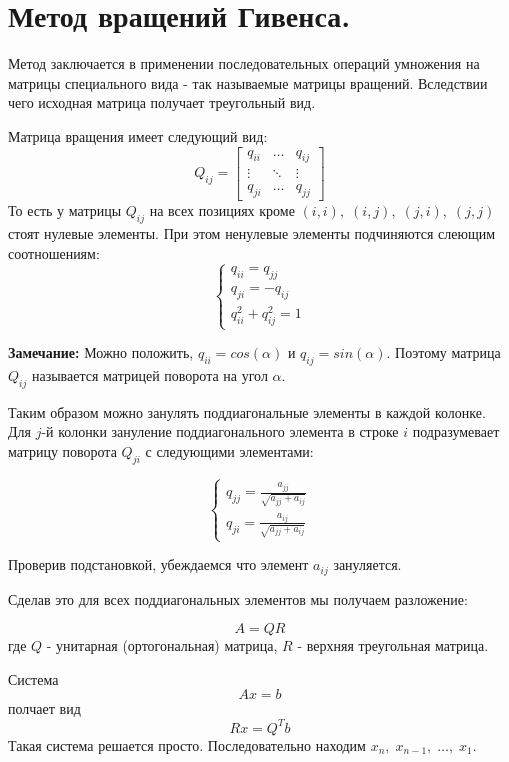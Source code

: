 \documentclass[a4paper,12pt]{article}
\begin{document}
\section*{Метод вращений Гивенса.}
Метод заключается в применении последовательных операций умножения на матрицы специального вида - так называемые матрицы вращений. Вследствии чего исходная матрица получает треугольный вид. 

Матрица вращения имеет следующий вид: 
\[
  Q_{ij} =
  \left[ 
    {
        \begin{array}{ccc}
            q_{ii} & \ldots & q_{ij} \\ 
            \vdots & \ddots & \vdots \\
            q_{ji} & \ldots & q_{jj}
        \end{array} 
    } 
  \right]
\]
То есть у матрицы $ Q_{ij} $ на всех позициях кроме 
    $ (i, i), \; (i, j), \; (j, i), \; (j, j) $ стоят нулевые элементы. 
При этом ненулевые элементы подчиняются слеющим соотношениям: 
    $$
        \begin{cases}
            q_{ii} = q_{jj} \\ 
            q_{ji} = -q_{ij} \\
            q_{ii}^2 + q_{ij}^2 = 1
        \end{cases}
    $$

\textbf{Замечание:} Можно положить, $ q_{ii} = cos(\alpha) $ и $ q_{ij} = sin(\alpha) $. Поэтому матрица $ Q_{ij} $ называется матрицей поворота на угол $ \alpha $.

Таким образом можно занулять поддиагональные элементы в каждой колонке. 
Для $ j $-й колонки зануление поддиагонального элемента в строке $ i $ подразумевает матрицу поворота $ Q_{ji} $ с следующими элементами:
        
$$
\begin{cases}
    q_{jj} = \frac{a_{jj}}{\sqrt{a_{jj} + a_{ij}}} \\
    q_{ji} = \frac{a_{ij}}{\sqrt{a_{jj} + a_{ij}}}
\end{cases}
$$

Проверив подстановкой, убеждаемся что элемент $ a_{ij} $ зануляется.

Сделав это для всех поддиагональных элементов мы получаем разложение: 

$$
A = QR
$$
где $ Q $ - унитарная (ортогональная) матрица, $ R $ - верхняя треугольная матрица.

Система 
$$
Ax = b 
$$
полчает вид 
$$
Rx = Q^Tb
$$
Такая система решается просто. Последовательно находим $ x_n,\; x_{n-1},\; \ldots,\; x_1 $. 
\end{document}
